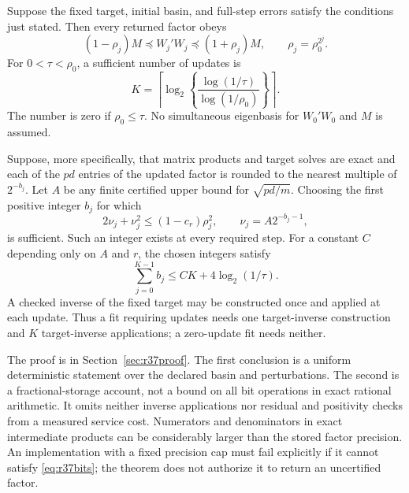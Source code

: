 \begin{theorem}\label{thm:r37precision}
Suppose the fixed target, initial basin, and full-step errors satisfy the
conditions just stated. Then every returned factor obeys
\begin{equation}\label{eq:r37double}
 (1-\rho_j)M\preceq W_j'W_j\preceq(1+\rho_j)M,
 \qquad \rho_j=\rho_0^{2^j}.
\end{equation}
For $0<\tau<\rho_0$, a sufficient number of updates is
\begin{equation}\label{eq:r37cap}
 K=\left\lceil\log_2\left\{
       \frac{\log(1/\tau)}{\log(1/\rho_0)}\right\}\right\rceil.
\end{equation}
The number is zero if $\rho_0\leq\tau$. No simultaneous eigenbasis for
$W_0'W_0$ and $M$ is assumed.

Suppose, more specifically, that matrix products and target solves are exact
and each of the $pd$ entries of the updated factor is rounded to the nearest
multiple of $2^{-b_j}$. Let $A$ be any finite certified upper bound for
$\sqrt{pd/m}$. Choosing the first positive integer $b_j$ for which
\begin{equation}\label{eq:r37bits}
 2\nu_j+\nu_j^2\leq(1-c_r)\rho_j^2,
 \qquad \nu_j=A2^{-b_j-1},
\end{equation}
is sufficient. Such an integer exists at every required step. For a constant
$C$ depending only on $A$ and $r$, the chosen integers satisfy
\begin{equation}\label{eq:r37bitaccount}
 \sum_{j=0}^{K-1}b_j\leq CK+4\log_2(1/\tau).
\end{equation}
A checked inverse of the fixed target may be constructed once and applied
at each update. Thus a fit requiring updates needs one target-inverse
construction and $K$ target-inverse applications; a zero-update fit needs
neither.
\end{theorem}

The proof is in Section~\ref{sec:r37proof}. The first conclusion is a
uniform deterministic statement over the declared basin and perturbations.
The second is a fractional-storage account, not a bound on all bit operations
in exact rational arithmetic. It omits neither inverse applications nor
residual and positivity checks from a measured service cost. Numerators and
denominators in exact intermediate products can be considerably larger than
the stored factor precision. An implementation with a fixed precision cap
must fail explicitly if it cannot satisfy \eqref{eq:r37bits}; the theorem
does not authorize it to return an uncertified factor.

